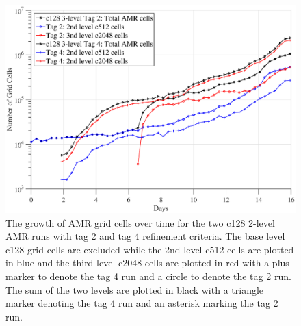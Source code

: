 \begin{figure}
   \centerline{%
   \noindent
   \includegraphics[width=\textwidth]{Chap2/c128_3l4_Tag2vs4_compare.eps}}
   \caption{The growth of AMR grid cells over time for the two c128 2-level AMR runs 
   with tag 2 and tag 4 refinement criteria. The base level c128 grid cells are excluded
   while the 2nd level c512 cells are plotted in blue and the third level c2048 cells are
   plotted in red with a plus marker to denote the tag 4 run and a circle to denote the
   tag 2 run.  The sum of the two levels are plotted in black with a triangle marker denoting
   the tag 4 run and an asterisk marking the tag 2 run. 
   }
   \label{fig.grid_num_c128}
\end{figure}

